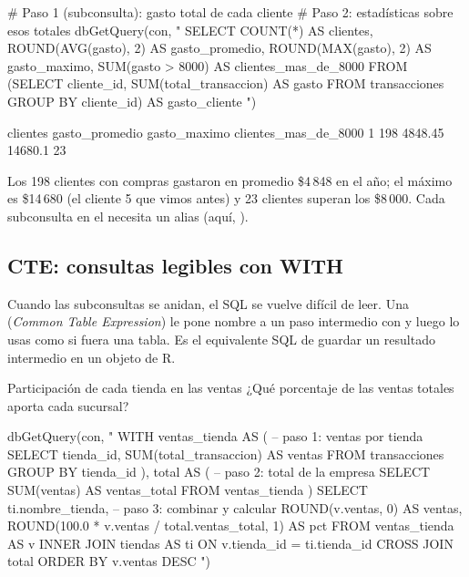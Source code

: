 \begin{rcode}
# Paso 1 (subconsulta): gasto total de cada cliente
# Paso 2: estadísticas sobre esos totales
dbGetQuery(con, "
  SELECT COUNT(*)                   AS clientes,
         ROUND(AVG(gasto), 2)       AS gasto_promedio,
         ROUND(MAX(gasto), 2)       AS gasto_maximo,
         SUM(gasto > 8000)          AS clientes_mas_de_8000
  FROM (SELECT cliente_id, SUM(total_transaccion) AS gasto
        FROM transacciones
        GROUP BY cliente_id) AS gasto_cliente
")
\end{rcode}

\begin{rsalida}
  clientes gasto_promedio gasto_maximo clientes_mas_de_8000
1      198        4848.45      14680.1                   23
\end{rsalida}

Los 198 clientes con compras gastaron en promedio \$4\,848 en el año; el
máximo es \$14\,680 (el cliente 5 que vimos antes) y 23 clientes superan los
\$8\,000. Cada subconsulta en el  necesita un alias (aquí,
).

\subsection{CTE: consultas legibles con WITH}

Cuando las subconsultas se anidan, el SQL se vuelve difícil de leer. Una
 (\emph{Common Table Expression}) le pone nombre a un paso
intermedio con  y luego lo usas como si
fuera una tabla. Es el equivalente SQL de guardar un resultado intermedio
en un objeto de R.

\begin{ejemplo}{Participación de cada tienda en las ventas}
¿Qué porcentaje de las ventas totales aporta cada sucursal?
\end{ejemplo}

\begin{rcode}
dbGetQuery(con, "
  WITH ventas_tienda AS (          -- paso 1: ventas por tienda
    SELECT tienda_id, SUM(total_transaccion) AS ventas
    FROM transacciones
    GROUP BY tienda_id
  ),
  total AS (                       -- paso 2: total de la empresa
    SELECT SUM(ventas) AS ventas_total FROM ventas_tienda
  )
  SELECT ti.nombre_tienda,         -- paso 3: combinar y calcular %
         ROUND(v.ventas, 0) AS ventas,
         ROUND(100.0 * v.ventas / total.ventas_total, 1) AS pct
  FROM ventas_tienda AS v
  INNER JOIN tiendas AS ti ON v.tienda_id = ti.tienda_id
  CROSS JOIN total
  ORDER BY v.ventas DESC
")
\end{rcode}

